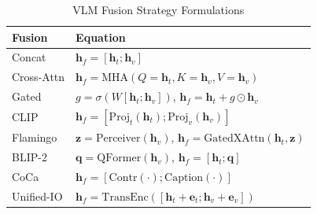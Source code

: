 \documentclass[10pt,journal,compsoc]{IEEEtran}
\begin{document}
\begin{table}[htbp]
\centering
\caption{VLM Fusion Strategy Formulations}
\label{tab:fusion_equations}
\small
\begin{tabular}{lp{4.5cm}}
\toprule
\textbf{Fusion} & \textbf{Equation} \\
\midrule
Concat & $\mathbf{h}_f = [\mathbf{h}_t; \mathbf{h}_v]$ \\
\midrule
Cross-Attn & $\mathbf{h}_f = \text{MHA}(Q{=}\mathbf{h}_t, K{=}\mathbf{h}_v, V{=}\mathbf{h}_v)$ \\
\midrule
Gated & $g = \sigma(W[\mathbf{h}_t; \mathbf{h}_v])$, $\mathbf{h}_f = \mathbf{h}_t + g \odot \mathbf{h}_v$ \\
\midrule
CLIP & $\mathbf{h}_f = [\text{Proj}_t(\mathbf{h}_t); \text{Proj}_v(\mathbf{h}_v)]$ \\
\midrule
Flamingo & $\mathbf{z} = \text{Perceiver}(\mathbf{h}_v)$, $\mathbf{h}_f = \text{GatedXAttn}(\mathbf{h}_t, \mathbf{z})$ \\
\midrule
BLIP-2 & $\mathbf{q} = \text{QFormer}(\mathbf{h}_v)$, $\mathbf{h}_f = [\mathbf{h}_t; \mathbf{q}]$ \\
\midrule
CoCa & $\mathbf{h}_f = [\text{Contr}(\cdot); \text{Caption}(\cdot)]$ \\
\midrule
Unified-IO & $\mathbf{h}_f = \text{TransEnc}([\mathbf{h}_t + \mathbf{e}_t; \mathbf{h}_v + \mathbf{e}_v])$ \\
\bottomrule
\end{tabular}
\end{table}
\end{document}
